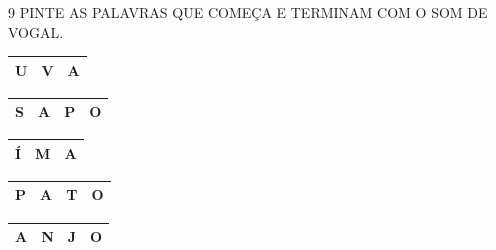 \begin{escola}
\num{9} PINTE AS PALAVRAS QUE COMEÇA E TERMINAM COM O SOM DE VOGAL.


\begin{longtable}[]{@{}lll@{}}
\toprule
U & V & A\tabularnewline
\bottomrule
\end{longtable}


\begin{longtable}[]{@{}llll@{}}
\toprule
S & A & P & O\tabularnewline
\bottomrule
\end{longtable}


\begin{longtable}[]{@{}lll@{}}
\toprule
Í & M & A\tabularnewline
\bottomrule
\end{longtable}


\begin{longtable}[]{@{}llll@{}}
\toprule
P & A & T & O\tabularnewline
\bottomrule
\end{longtable}


\begin{longtable}[]{@{}llll@{}}
\toprule
A & N & J & O\tabularnewline
\bottomrule
\end{longtable}






\end{escola}
